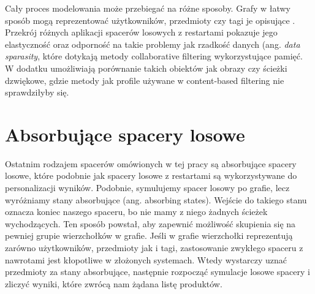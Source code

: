 Cały proces modelowania może przebiegać na różne sposoby. Grafy w łatwy sposób mogą reprezentować użytkowników, przedmioty czy tagi je opisujące \cite{RecommenderASurvey}. Przekrój różnych aplikacji spacerów losowych z restartami pokazuje jego elastyczność oraz odporność na takie problemy jak rzadkość danych (ang. \textit{data sparasity}, które dotykają metody collaborative filtering wykorzystujące pamięć. W dodatku umożliwiają porównanie takich obiektów jak obrazy czy ścieżki dzwiękowe, gdzie metody jak profile używane w content-based filtering nie sprawdziłyby się.


\section{Absorbujące spacery losowe}
\label{chap:abs}

Ostatnim rodzajem spacerów omówionych w tej pracy są absorbujące spacery losowe, które podobnie jak spacery losowe z restartami są wykorzystywane do personalizacji wyników. Podobnie, symulujemy spacer losowy po grafie, lecz  wyróżniamy stany absorbujące (ang. absorbing states). Wejście do takiego stanu oznacza koniec naszego spaceru, bo nie mamy z niego żadnych ścieżek wychodzących. Ten sposób powstał, aby zapewnić możliwość skupienia się na pewniej grupie wierzchołków w grafie. Jeśli w grafie wierzchołki reprezentują zarówno użytkowników, przedmioty jak i tagi, zastosowanie zwykłego spaceru z nawrotami jest kłopotliwe w złożonych systemach. Wtedy wystarczy uznać przedmioty za stany absorbujące, następnie rozpocząć symulacje losowe spacery i zliczyć wyniki, które zwrócą nam żądana listę produktów.
